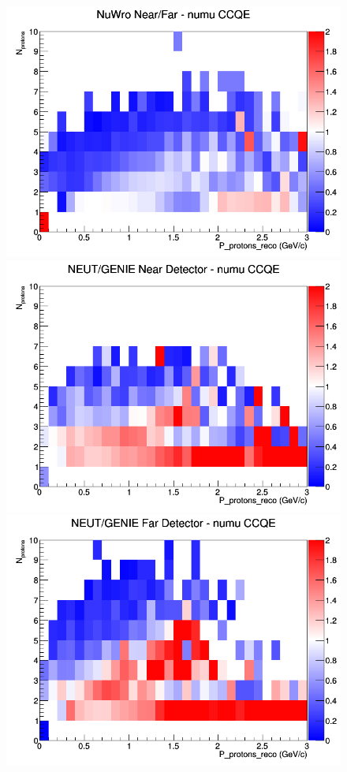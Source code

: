 \begin{figure}[h]
\endminipage
{}
\includegraphics[width=\linewidth]{eff_N_P/FGT/protons/ratios/CCQE_NuWro_numu_NF_N_P.png}
\endminipage
\newline
{}
\includegraphics[width=\linewidth]{eff_N_P/FGT/protons/ratios/CCQE_NEUT_GENIE_numu_near_N_P.png}
\endminipage
{}
\includegraphics[width=\linewidth]{eff_N_P/FGT/protons/ratios/CCQE_NEUT_GENIE_numu_far_N_P.png}

\end{figure}
